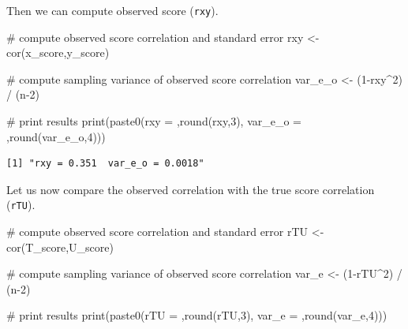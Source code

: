 \documentclass[
  letterpaper,
  DIV=11,
  numbers=noendperiod]{scrreprt}
\newenvironment{Shaded}{\begin{snugshade}}{\end{snugshade}}
\newcommand{\CommentTok}[1]{\textcolor[rgb]{0.37,0.37,0.37}{#1}}
\newcommand{\DecValTok}[1]{\textcolor[rgb]{0.68,0.00,0.00}{#1}}
\newcommand{\FunctionTok}[1]{\textcolor[rgb]{0.28,0.35,0.67}{#1}}
\newcommand{\NormalTok}[1]{\textcolor[rgb]{0.00,0.23,0.31}{#1}}
\newcommand{\OtherTok}[1]{\textcolor[rgb]{0.00,0.23,0.31}{#1}}
\newcommand{\SpecialCharTok}[1]{\textcolor[rgb]{0.37,0.37,0.37}{#1}}
\newcommand{\StringTok}[1]{\textcolor[rgb]{0.13,0.47,0.30}{#1}}
\begin{document}
Then we can compute observed score (\texttt{rxy}).

\begin{Shaded}
\begin{Highlighting}[]
\CommentTok{\# compute observed score correlation and standard error}
\NormalTok{rxy }\OtherTok{\textless{}{-}} \FunctionTok{cor}\NormalTok{(x\_score,y\_score)}

\CommentTok{\# compute sampling variance of observed score correlation}
\NormalTok{var\_e\_o }\OtherTok{\textless{}{-}}\NormalTok{ (}\DecValTok{1}\SpecialCharTok{{-}}\NormalTok{rxy}\SpecialCharTok{\^{}}\DecValTok{2}\NormalTok{) }\SpecialCharTok{/}\NormalTok{ (n}\DecValTok{{-}2}\NormalTok{)}

\CommentTok{\# print results}
\FunctionTok{print}\NormalTok{(}\FunctionTok{paste0}\NormalTok{(}\StringTok{\textquotesingle{}rxy = \textquotesingle{}}\NormalTok{,}\FunctionTok{round}\NormalTok{(rxy,}\DecValTok{3}\NormalTok{),}\StringTok{\textquotesingle{}  var\_e\_o = \textquotesingle{}}\NormalTok{,}\FunctionTok{round}\NormalTok{(var\_e\_o,}\DecValTok{4}\NormalTok{)))}
\end{Highlighting}
\end{Shaded}

\begin{verbatim}
[1] "rxy = 0.351  var_e_o = 0.0018"
\end{verbatim}

Let us now compare the observed correlation with the true score
correlation (\texttt{rTU}).

\begin{Shaded}
\begin{Highlighting}[]
\CommentTok{\# compute observed score correlation and standard error}
\NormalTok{rTU }\OtherTok{\textless{}{-}} \FunctionTok{cor}\NormalTok{(T\_score,U\_score)}

\CommentTok{\# compute sampling variance of observed score correlation}
\NormalTok{var\_e }\OtherTok{\textless{}{-}}\NormalTok{ (}\DecValTok{1}\SpecialCharTok{{-}}\NormalTok{rTU}\SpecialCharTok{\^{}}\DecValTok{2}\NormalTok{) }\SpecialCharTok{/}\NormalTok{ (n}\DecValTok{{-}2}\NormalTok{)}

\CommentTok{\# print results}
\FunctionTok{print}\NormalTok{(}\FunctionTok{paste0}\NormalTok{(}\StringTok{\textquotesingle{}rTU = \textquotesingle{}}\NormalTok{,}\FunctionTok{round}\NormalTok{(rTU,}\DecValTok{3}\NormalTok{),}\StringTok{\textquotesingle{}  var\_e = \textquotesingle{}}\NormalTok{,}\FunctionTok{round}\NormalTok{(var\_e,}\DecValTok{4}\NormalTok{)))}
\end{Highlighting}
\end{Shaded}
\end{document}
